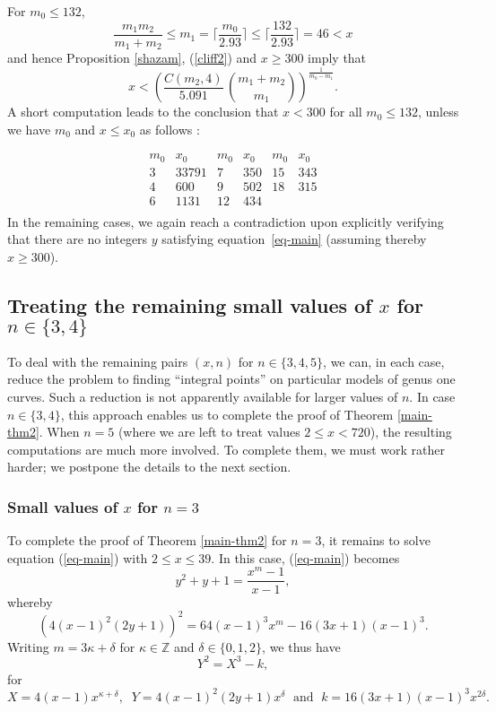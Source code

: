 {For $m_0 \leq 132$, 
$$
\frac{m_1m_2}{m_1+m_2} \leq m_1 = \Big\lceil \frac{m_0}{2.93} \Big\rceil \leq   \Big\lceil \frac{132}{2.93} \Big\rceil = 46 < x
$$
 and hence Proposition \ref{shazam}, (\ref{cliff2}) and $x \geq 300$ imply that
$$
x < \left( \frac{C(m_2, 4)}{5.091} \, \binom{m_1+m_2}{m_1} \right)^{\frac{1}{m_0-m_1}}.
$$
 A short computation leads to the conclusion that $x<300$ for all $m_0\leq 132$, unless we have $m_0$ and $x \leq x_0$ as follows :
 
 $$
\begin{array}{cc|cc|cc} 
m_0 & x_0 & m_0 & x_0 & m_0 & x_0 \\ \hline
3 & 33791 & 7 & 350 & 15 & 343 \\
4 & 600 & 9 & 502 & 18 & 315 \\
6 & 1131 &12 & 434 & & \\
\end{array}
$$
In the remaining cases, we again reach a contradiction  upon explicitly verifying that there are no integers $y$ satisfying equation~\eqref{eq-main} (assuming thereby $x\geq 300$). 

 \subsection{Treating the remaining small values of $x$ for $n \in \{ 3, 4 \}$}

To deal with the remaining pairs $(x,n)$ for $n \in \{ 3, 4, 5 \}$, we can, in each case, reduce the problem to finding ``integral points'' on particular models of genus one curves. Such a reduction is not apparently available for larger values of $n$. In case $n \in \{ 3, 4 \}$, this approach enables us to complete the proof of Theorem \ref{main-thm2}. When $n=5$ (where we are left to treat values $2 \leq x < 720$), the resulting computations are much more involved. To complete them, we must work rather harder; we postpone the details to the next section.

 \subsubsection{Small values of $x$ for $n=3$}

To complete the proof of Theorem \ref{main-thm2} for $n=3$, it remains to solve equation (\ref{eq-main}) with $2 \leq x \leq 39$.
In this case,  (\ref{eq-main}) becomes
\begin{equation} \label{eq-three}
y^2+y+1 = \frac{x^m-1}{x-1},
\end{equation}
whereby
$$
\left( 4 (x-1)^2 (2y+1) \right)^2 = 64 (x-1)^3  x^m - 16 (3x+1)(x-1)^3.
$$
Writing $m = 3 \kappa + \delta$ for $\kappa \in \mathbb{Z}$ and $\delta \in \{ 0, 1, 2 \}$, we thus have
\begin{equation} \label{Mordell}
Y^2 = X^3 - k,
\end{equation}
for 
$$
X = 4 (x-1) x^{\kappa+\delta}, \; \; Y = 4 (x-1)^2 (2y+1) x^\delta \; \mbox{ and } \; k = 16 (3x+1)(x-1)^3 x^{2 \delta}.
$$

}
